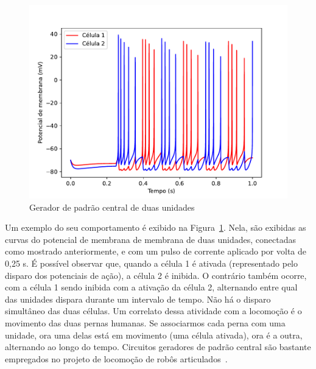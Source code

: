 \begin{figure}[tb]
	\centering
	\caption[Gerador de padrão central de duas unidades]{Gerador de padrão central de duas unidades}
	\label{fig:cpg}
	\includegraphics[width=0.7\linewidth]{figs/cpg}
\end{figure}
Um exemplo do seu comportamento é exibido na Figura~\ref{fig:cpg}. Nela, são exibidas as curvas do potencial de membrana de membrana de duas unidades, conectadas como mostrado anteriormente, e com um pulso de corrente aplicado por volta de 0,25 s. É possível observar que, quando a célula 1 é ativada (representado pelo disparo dos potenciais de ação), a célula 2 é inibida. O contrário também ocorre, com a célula 1 sendo inibida com a ativação da célula 2, alternando entre qual das unidades dispara durante um intervalo de tempo. Não há o disparo simultâneo das duas células. Um correlato dessa atividade com a locomoção é o movimento das duas pernas humanas. Se associarmos cada perna com uma unidade, ora uma delas está em movimento (uma célula ativada), ora é a outra, alternando ao longo do tempo. Circuitos geradores de padrão central são bastante empregados no projeto de locomoção de robôs articulados~\cite{ijspeert_central_2008}.

